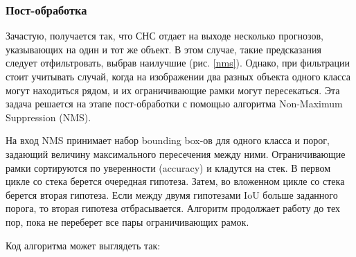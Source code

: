 \subsubsection{Пост-обработка}

Зачастую, получается так, что СНС отдает на выходе несколько прогнозов, указывающих на один и тот же объект. В этом случае, такие предсказания следует отфильтровать, выбрав наилучшие (рис. \ref{nms}). Однако, при фильтрации стоит учитывать случай, когда на изображении два разных объекта одного класса могут находиться рядом, и их ограничивающие рамки могут пересекаться. Эта задача решается на этапе пост-обработки с помощью алгоритма Non-Maximum Suppression (NMS).


На вход NMS принимает набор bounding box-ов для одного класса и порог, задающий величину максимального пересечения между ними. Ограничивающие рамки сортируются по уверенности (accuracy) и кладутся на стек. В первом цикле со стека берется очередная гипотеза. Затем, во вложенном цикле со стека берется вторая гипотеза. Если между двумя гипотезами IoU больше заданного порога, то вторая гипотеза отбрасывается. Алгоритм продолжает работу до тех пор, пока не переберет все пары ограничивающих рамок.

Код алгоритма может выглядеть так:

